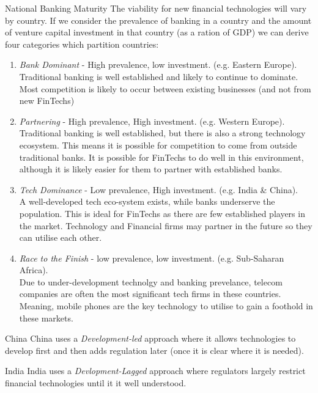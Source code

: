 \documentclass[11pt,a4paper]{article}
\begin{document}
\begin{proposition}{National Banking Maturity}
  The viability for new financial technologies will vary by country. If we consider the prevalence of banking in a country and the amount of venture capital investment in that country (as a ration of GDP) we can derive four categories which partition countries:
  \begin{enumerate}
    \item \textit{Bank Dominant} - High prevalence, low investment. (e.g. Eastern Europe).\\
    Traditional banking is well established and likely to continue to dominate. Most competition is likely to occur between existing businesses (and not from new FinTechs)
    \item \textit{Partnering} - High prevalence, High investment. (e.g. Western Europe).\\
    Traditional banking is well established, but there is also a strong technology ecosystem. This means it is possible for competition to come from outside traditional banks. It is possible for FinTechs to do well in this environment, although it is likely easier for them to partner with established banks.
    \item \textit{Tech Dominance} - Low prevalence, High investment. (e.g. India \& China).\\
    A well-developed tech eco-system exists, while banks underserve the population. This is ideal for FinTechs as there are few established players in the market. Technology and Financial firms may partner in the future so they can utilise each other.
    \item \textit{Race to the Finish} - low prevalence, low investment. (e.g. Sub-Saharan Africa).\\
    Due to under-development technolgy and banking prevelance, telecom companies are often the most significant tech firms in these countries. Meaning, mobile phones are the key technology to utilise to gain a foothold in these markets.
  \end{enumerate}
\end{proposition}

\begin{remark}{China}
  China uses a \textit{Development-led} approach where it allows technologies to develop first and then adds regulation later (once it is clear where it is needed).
\end{remark}

\begin{remark}{India}
  India uses a \textit{Devlopment-Lagged} approach where regulators largely restrict financial technologies until it it well understood.
\end{remark}
\end{document}
